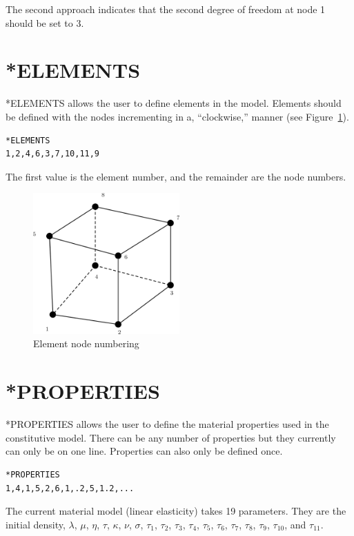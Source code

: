 \documentclass{asme2ej}
\begin{document}
The second approach indicates that the second degree of freedom at node 1 should be set to 3.

\section{*ELEMENTS}

*ELEMENTS allows the user to define elements in the model. Elements should be defined with the nodes incrementing in a, ``clockwise,'' manner (see Figure~\ref{fig:node_numbering}).

\begin{verbatim}
*ELEMENTS
1,2,4,6,3,7,10,11,9
\end{verbatim}

The first value is the element number, and the remainder are the node numbers.

\begin{figure}
\centering
\includegraphics[width=0.5\textwidth]{./element.png}
\caption{Element node numbering}
\label{fig:node_numbering}
\end{figure}

\section{*PROPERTIES}

*PROPERTIES allows the user to define the material properties used in the constitutive model. There can be any number of properties but they currently can only be on one line. Properties can also only be defined once.

\begin{verbatim}
*PROPERTIES
1,4,1,5,2,6,1,.2,5,1.2,...
\end{verbatim}

The current material model (linear elasticity) takes 19 parameters. They are the initial density, $\lambda$, $\mu$, $\eta$, $\tau$, $\kappa$, $\nu$, $\sigma$, $\tau_1$, $\tau_2$,  $\tau_3$, $\tau_4$, $\tau_5$, $\tau_6$, $\tau_7$, $\tau_8$, $\tau_9$, $\tau_{10}$, and $\tau_{11}$.
\end{document}
